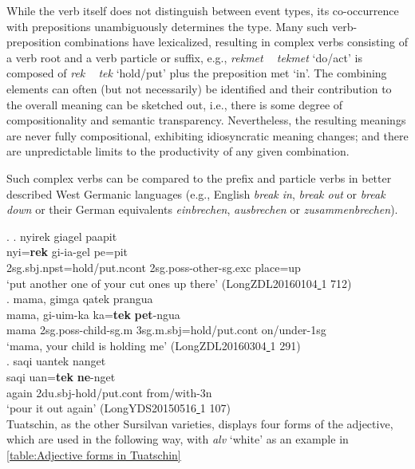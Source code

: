 \documentclass[a4paper, 11pt]{book}
\newcommand{\source}[1]{\hfill (#1)\\[-0.2cm]}	%
\newcommand{\und}{\underline{{ }}\hspace{0.2mm}}	%
\begin{document}
While the verb itself does not distinguish between event types, its co-occurrence with prepositions unambiguously determines the type. Many such verb-preposition combinations have lexicalized, resulting in complex verbs consisting of  a verb root and a verb particle or suffix, e.g., \textit{rekmet ~ tekmet} ‘do/act’ is composed of \textit{rek ~ tek} ‘hold/put’ plus the preposition met ‘in’. The combining elements can often (but not necessarily) be identified and their contribution to the overall meaning can be sketched out, i.e., there is some degree of compositionality and semantic transparency.
Nevertheless, the resulting meanings are never fully compositional, exhibiting idiosyncratic meaning changes; and there are unpredictable limits to the productivity of any given combination.

Such complex verbs can be compared to the prefix and particle verbs in better described West Germanic languages (e.g., English \textit{break in}, \textit{break out} or \textit{break down} or their German equivalents \textit{einbrechen}, \textit{ausbrechen} or \textit{zusammenbrechen}).

\ex.
\ag. nyirek giagel paapit \\
        nyi=\textbf{rek}	gi-ia-gel	pe=pit\\
        2sg.sbj.npst=hold/put.ncont	2sg.poss-other-sg.exc	place=up\\
        ‘put another one of your cut ones up there’ \source{LongZDL20160104\und 1 712}
\bg. mama, gimga qatek prangua \\
	mama,	gi-uim-ka	ka=\textbf{tek}	\textbf{pet}-ngua \\
	mama	2sg.poss-child-sg.m	3sg.m.sbj=hold/put.cont	on/under-1sg \\
        ‘mama, your child is holding me’ \source{LongZDL20160304\und 1 291}
\cg. saqi uantek nanget\\
	saqi	uan=\textbf{tek}	\textbf{ne}-nget \\
	again	2du.sbj-hold/put.cont	from/with-3n \\
‘pour it out again’ \source{LongYDS20150516\und 1 107}

Tuatschin, as the other Sursilvan varieties, displays four forms of the adjective, which are used in the following way, with \textit{alv} ‘white’ as an example in \ref{table:Adjective forms in Tuatschin}
\end{document}
